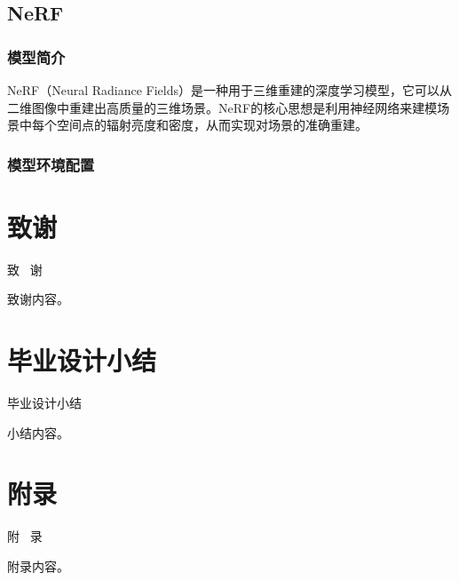 \documentclass{nwputhesis}
\begin{document}
\subsection{NeRF}
\subsubsection{模型简介}
NeRF（Neural Radiance Fields）是一种用于三维重建的深度学习模型，它可以从二维图像中重建出高质量的三维场景。NeRF的核心思想是利用神经网络来建模场景中每个空间点的辐射亮度和密度，从而实现对场景的准确重建。
\subsubsection{模型环境配置}
\makespace
\section*{致谢}
\begin{center}
    { \blackti \fontsize{16.0600pt}{1.25}致 \, 谢}
\end{center}
致谢内容。

\section*{毕业设计小结}
\makespace
\begin{center}
    { \blackti \fontsize{16.0600pt}{1.25}毕业设计小结}
\end{center}
小结内容。

\makespace
\section*{附录}
\begin{center}
    { \blackti \fontsize{16.0600pt}{1.25}附 \, 录}
\end{center}
附录内容。
\end{document}
